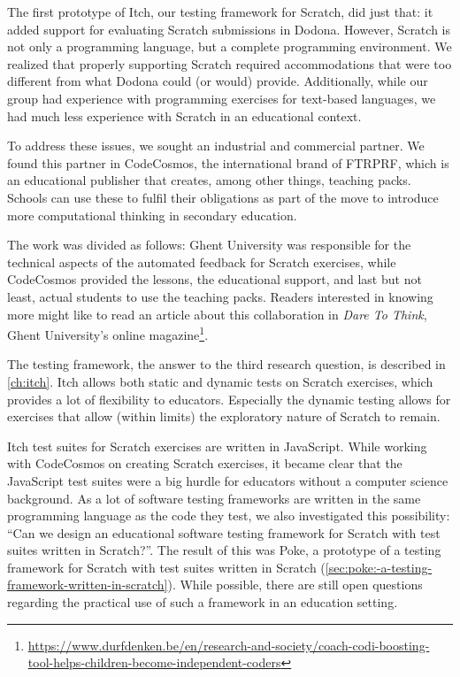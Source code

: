 \documentclass[../main]{subfiles}
\begin{document}
The first prototype of Itch, our testing framework for Scratch, did just that: it added support for evaluating Scratch submissions in Dodona.
However, Scratch is not only a programming language, but a complete programming environment.
We realized that properly supporting Scratch required accommodations that were too different from what Dodona could (or would) provide.
Additionally, while our group had experience with programming exercises for text-based languages, we had much less experience with Scratch in an educational context.

To address these issues, we sought an industrial and commercial partner.
We found this partner in CodeCosmos, the international brand of FTRPRF, which is an educational publisher that creates, among other things, teaching packs.
Schools can use these to fulfil their obligations as part of the move to introduce more computational thinking in secondary education.

The work was divided as follows: Ghent University was responsible for the technical aspects of the automated feedback for Scratch exercises, while CodeCosmos provided the lessons, the educational support, and last but not least, actual students to use the teaching packs.
Readers interested in knowing more might like to read an article about this collaboration in \textit{Dare To Think}, Ghent University's online magazine\footnote{\url{https://www.durfdenken.be/en/research-and-society/coach-codi-boosting-tool-helps-children-become-independent-coders}}.

The testing framework, the answer to the third research question, is described in \cref{ch:itch}.
Itch allows both static and dynamic tests on Scratch exercises, which provides a lot of flexibility to educators.
Especially the dynamic testing allows for exercises that allow (within limits) the exploratory nature of Scratch to remain.

Itch test suites for Scratch exercises are written in JavaScript.
While working with CodeCosmos on creating Scratch exercises, it became clear that the JavaScript test suites were a big hurdle for educators without a computer science background.
As a lot of software testing frameworks are written in the same programming language as the code they test, we also investigated this possibility: ``Can we design an educational software testing framework for Scratch with test suites written in Scratch?''.
The result of this was Poke, a prototype of a testing framework for Scratch with test suites written in Scratch (\cref{sec:poke:-a-testing-framework-written-in-scratch}).
While possible, there are still open questions regarding the practical use of such a framework in an education setting.
\end{document}

